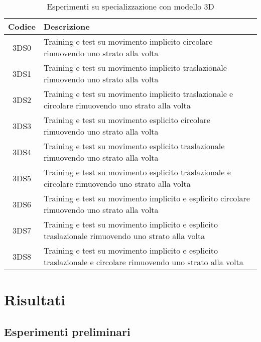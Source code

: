 \begin{table}[H]
	\begin{tabularx}{\textwidth}{|c|X|}
		\hline 
		\textbf{Codice} &
		\textbf{Descrizione} \\ 
		
		\hline 3DS0 &
		Training e test su movimento implicito circolare rimuovendo uno strato alla volta \\ 
		
		\hline 3DS1 &
		Training e test su movimento implicito traslazionale rimuovendo uno strato alla volta \\ 
		
		\hline 3DS2 & 
		Training e test su movimento implicito traslazionale e circolare rimuovendo uno strato alla volta \\
		
		\hline 3DS3 &
		Training e test su movimento esplicito circolare rimuovendo uno strato alla volta \\ 
		
		\hline 3DS4 &
		Training e test su movimento esplicito traslazionale rimuovendo uno strato alla volta \\ 
		
		\hline 3DS5 & 
		Training e test su movimento esplicito traslazionale e circolare rimuovendo uno strato alla volta \\ 
		
		\hline 3DS6 &
		Training e test su movimento implicito e esplicito circolare rimuovendo uno strato alla volta \\ 
		
		\hline 3DS7 &
		Training e test su movimento implicito e esplicito traslazionale rimuovendo uno strato alla volta \\ 
		
		\hline 3DS8 & 
		Training e test su movimento implicito e esplicito traslazionale e circolare rimuovendo uno strato alla volta \\ 
		\hline 
	\end{tabularx}
	\caption{Esperimenti su specializzazione con modello 3D}
	\label{esperimenti-specializzazione-3D}
\end{table}

\section{Risultati}

\subsection{Esperimenti preliminari}

